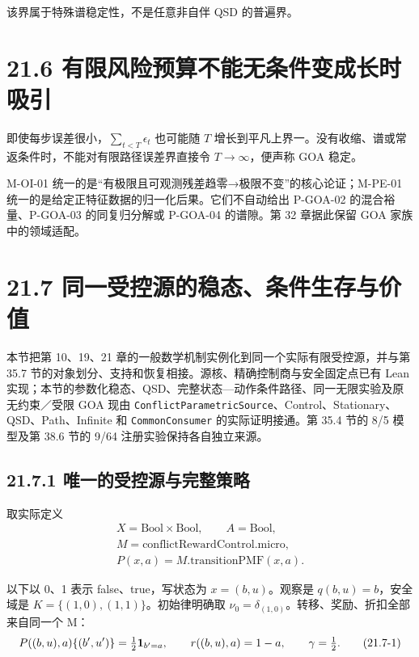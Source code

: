 \documentclass[
  11pt,
  oneside]{book}
\begin{document}
该界属于特殊谱稳定性，不是任意非自伴 QSD 的普遍界。

\section{21.6 有限风险预算不能无条件变成长时吸引}\label{ux6709ux9650ux98ceux9669ux9884ux7b97ux4e0dux80fdux65e0ux6761ux4ef6ux53d8ux6210ux957fux65f6ux5438ux5f15}

即使每步误差很小，\(\sum_{t<T}\epsilon_t\) 也可能随 \(T\) 增长到平凡上界一。没有收缩、谱或常返条件时，不能对有限路径误差界直接令 \(T\to\infty\)，便声称 GOA 稳定。

M-OI-01 统一的是``有极限且可观测残差趋零→极限不变''的核心论证；M-PE-01 统一的是给定正特征数据的归一化后果。它们不自动给出 P-GOA-02 的混合裕量、P-GOA-03 的同复归分解或 P-GOA-04 的谱隙。第 32 章据此保留 GOA 家族中的领域适配。

\section{21.7 同一受控源的稳态、条件生存与价值}\label{ux540cux4e00ux53d7ux63a7ux6e90ux7684ux7a33ux6001ux6761ux4ef6ux751fux5b58ux4e0eux4ef7ux503c}

本节把第 10、19、21 章的一般数学机制实例化到同一个实际有限受控源，并与第 35.7 节的对象划分、支持和恢复相接。源核、精确控制商与安全固定点已有 Lean 实现；本节的参数化稳态、QSD、完整状态---动作条件路径、同一无限实验及原无约束／受限 GOA 现由 \nolinkurl{ConflictParametricSource}、Control、Stationary、QSD、Path、Infinite 和 \nolinkurl{CommonConsumer} 的实际证明接通。第 35.4 节的 8/5 模型及第 38.6 节的 9/64 注册实验保持各自独立来源。

\subsection{21.7.1 唯一的受控源与完整策略}\label{ux552fux4e00ux7684ux53d7ux63a7ux6e90ux4e0eux5b8cux6574ux7b56ux7565}

取实际定义 \[\begin{gathered}
X=\mathrm{Bool}\times\mathrm{Bool},\qquad A=\mathrm{Bool},\\
M=\mathrm{conflictRewardControl.micro},\\
P(x,a)=M.\mathrm{transitionPMF}(x,a).
\end{gathered}\]

以下以 0、1 表示 false、true，写状态为 \(x=(b,u)\)。观察是 \(q(b,u)=b\)，安全域是 \(K=\{(1,0),(1,1)\}\)。初始律明确取 \(\nu_0=\delta_{(1,0)}\)。转移、奖励、折扣全部来自同一个 M： \[P((b,u),a)\{(b',u')\}=\tfrac12{\bf1}_{b'=a},\qquad
r((b,u),a)=1-a,\qquad \gamma=\tfrac12.                 \tag{21.7-1}\]
\end{document}
